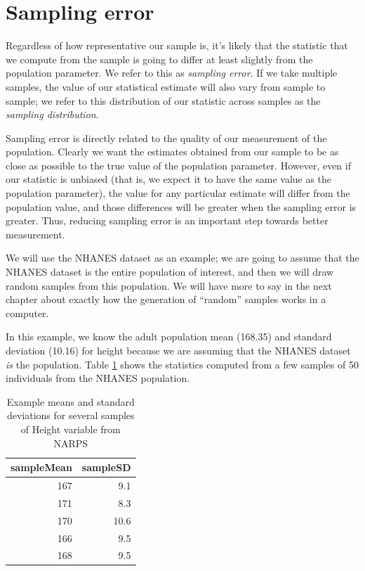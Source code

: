 \documentclass[12pt,]{book}
\theoremstyle{definition}
\theoremstyle{definition}
\theoremstyle{definition}
\theoremstyle{remark}
\begin{document}
\hypertarget{samplingerror}{%
\section{Sampling error}\label{samplingerror}}

Regardless of how representative our sample is, it's likely that the statistic that we compute from the sample is going to differ at least slightly from the population parameter. We refer to this as \emph{sampling error}. If we take multiple samples, the value of our statistical estimate will also vary from sample to sample; we refer to this distribution of our statistic across samples as the \emph{sampling distribution}.

Sampling error is directly related to the quality of our measurement of the population. Clearly we want the estimates obtained from our sample to be as close as possible to the true value of the population parameter. However, even if our statistic is unbiased (that is, we expect it to have the same value as the population parameter), the value for any particular estimate will differ from the population value, and those differences will be greater when the sampling error is greater. Thus, reducing sampling error is an important step towards better measurement.

We will use the NHANES dataset as an example; we are going to assume that the NHANES dataset is the entire population of interest, and then we will draw random samples from this population. We will have more to say in the next chapter about exactly how the generation of ``random'' samples works in a computer.

In this example, we know the adult population mean (168.35) and standard deviation (10.16) for height because we are assuming that the NHANES dataset \emph{is} the population. Table \ref{tab:sampleExample} shows the statistics computed from a few samples of 50 individuals from the NHANES population.

\begin{table}

\caption{\label{tab:sampleExample}Example means and standard deviations for several samples of Height variable from NARPS}
\centering
\begin{tabular}[t]{r|r}
\hline
sampleMean & sampleSD\\
\hline
167 & 9.1\\
\hline
171 & 8.3\\
\hline
170 & 10.6\\
\hline
166 & 9.5\\
\hline
168 & 9.5\\
\hline
\end{tabular}
\end{table}
\end{document}
